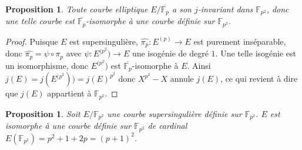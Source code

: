 \documentclass{article}
\theoremstyle{plain}%
\newtheorem{prop}[thm]{Proposition}
\theoremstyle{definition}%
\newcommand{\F}{\mathbb{F}}
\newcommand{\h}{\widehat}
\newcommand{\ol}{\overline}
\begin{document}
\begin{prop}
  Toute courbe elliptique $E/\overline{\F_p}$ a son $j$-invariant dans $\F_{p^2}$, donc une telle courbe est $\overline{\F_p}$-isomorphe à une courbe définie sur $\F_{p^2}$. 
\end{prop}

\begin{proof}
  Puisque $E$ est supersingulière, $\h{\pi_p} : E^{(p)} \to  E$ est purement inséparable, donc $\h{\pi_p} = \psi \circ \pi_p$ avec $\psi : E^{(p^2}) \to E$ une isogénie de degré $1$. Une telle isogénie est un isomorphisme, donc $ E^{(p^2}) $ est $\ol{\F_p}$-isomorphe à $E$. Ainsi $j(E) = j( E^{(p^2}) ) = j(E)^{p^2}$ donc $X^{p^2} - X$ annule $j(E)$, ce qui revient à dire que $j(E)$ appartient à $\F_{p^2}$.
\end{proof}

\begin{prop}
\label{cardsuper} 
  Soit $E/\F_{p^2}$ une courbe supersingulière définie sur $\F_{p^2}$. $E$ est isomorphe à une courbe définie sur $\F_{p^2}$ de cardinal $E(\F_{p^2}) = p^2 + 1 + 2p = (p+1)^2$.
\end{prop}
\end{document}

